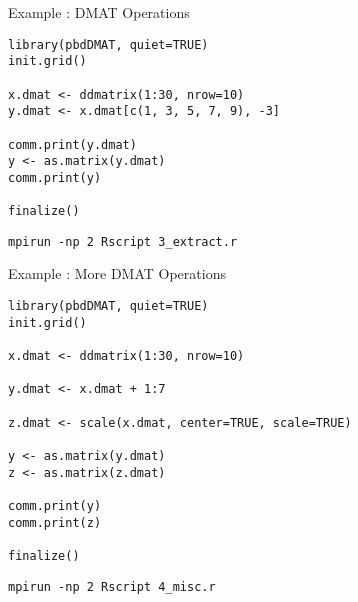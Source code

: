 \begin{frame}[fragile]
  \begin{exampleblock}{Example \countex:  DMAT Operations}\pause
\begin{lstlisting}[title=Generate locally only what is needed]
library(pbdDMAT, quiet=TRUE)
init.grid()

x.dmat <- ddmatrix(1:30, nrow=10)
y.dmat <- x.dmat[c(1, 3, 5, 7, 9), -3]

comm.print(y.dmat)
y <- as.matrix(y.dmat)
comm.print(y)

finalize()
\end{lstlisting}
\begin{lstlisting}[basicstyle=\tiny,backgroundcolor=\color{white},keywordstyle=\color{black},title=\fontsize{6pt}{7.2}\selectfont Execute this script via:]
mpirun -np 2 Rscript 3_extract.r
\end{lstlisting} 
  \end{exampleblock}
\end{frame}



\begin{frame}[fragile]
  \begin{exampleblock}{Example \countex:  More DMAT Operations}\pause
\begin{lstlisting}
library(pbdDMAT, quiet=TRUE)
init.grid()

x.dmat <- ddmatrix(1:30, nrow=10)

y.dmat <- x.dmat + 1:7

z.dmat <- scale(x.dmat, center=TRUE, scale=TRUE)

y <- as.matrix(y.dmat)
z <- as.matrix(z.dmat)

comm.print(y)
comm.print(z)

finalize()
\end{lstlisting}
\begin{lstlisting}[basicstyle=\tiny,backgroundcolor=\color{white},keywordstyle=\color{black},title=\fontsize{6pt}{7.2}\selectfont Execute this script via:]
mpirun -np 2 Rscript 4_misc.r
\end{lstlisting} 
  \end{exampleblock}
\end{frame}




